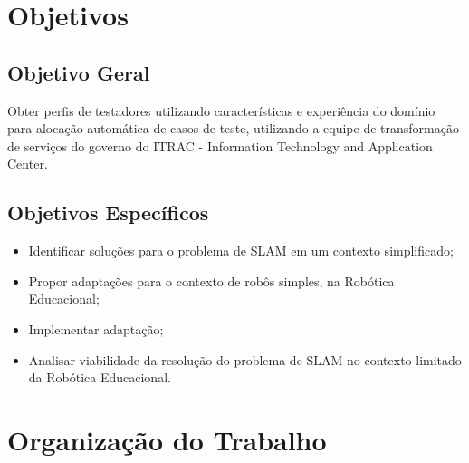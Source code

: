 \section{Objetivos}
\subsection{Objetivo Geral}

Obter perfis de testadores utilizando características e experiência do domínio para alocação automática de casos de teste,
utilizando a equipe de transformação de serviços do governo do ITRAC - Information Technology and Application Center.

\subsection{Objetivos Específicos}

\begin{itemize}
		\item Identificar soluções para o problema de SLAM em um contexto simplificado;
		\item Propor adaptações para o contexto de robôs simples, na Robótica Educacional;
		\item Implementar adaptação;
		\item Analisar viabilidade da resolução do problema de SLAM no contexto limitado da Robótica Educacional.
	\end{itemize}

\section{Organização do Trabalho}
